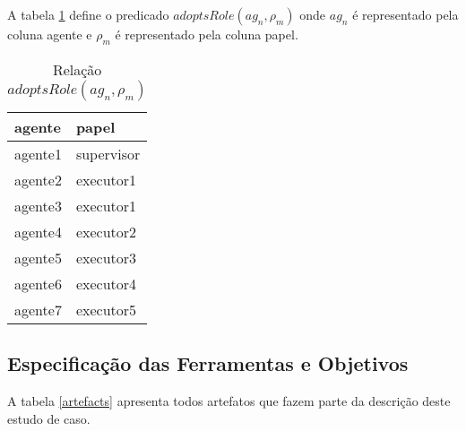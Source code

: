 A tabela \ref{agentsroles} define o predicado $adoptsRole(ag_n,\rho_m)$ onde $ag_n$ é representado pela coluna agente e $\rho_m$ é representado pela coluna papel.

\begin{table}[H]
\centering
\begin{tabular}{|l|l|}
\hline
\textbf{agente} & \textbf{papel} \\ \hline
agente1 & supervisor \\ \hline
agente2 & executor1 \\ \hline
agente3 & executor1 \\ \hline
agente4 & executor2 \\ \hline
agente5 & executor3 \\ \hline
agente6 & executor4 \\ \hline
agente7 & executor5 \\ \hline
\end{tabular}
\caption{Relação $adoptsRole(ag_n,\rho_m)$}
\label{agentsroles}
\end{table}

\subsection{Especificação das Ferramentas e Objetivos}

A tabela \ref{artefacts} apresenta todos artefatos que fazem parte da descrição deste estudo de caso.

